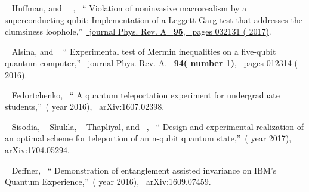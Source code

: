 \documentclass[aps,pra,twocolumn,groupedaddress,showpacs,showkeys]{revtex4-1}
\begin{document}
\begin{thebibliography}{27}
  \BibitemOpen
   { {~\bibnamefont
  {Huffman}}, and\  {~},\ }  {\enquote { {Violation of noninvasive macrorealism by a superconducting qubit: Implementation of a Leggett-Garg test that addresses the clumsiness loophole},}\ }\href {\doibase 10.1103/PhysRevA.95.032131} { {\bibinfo
  {journal} {Phys. Rev. A}\ }\textbf { {95}},\ \bibinfo
  {pages} {032131} ( {2017})}.%

  \BibitemOpen
   { {~\bibnamefont
  {Alsina}}, and  \ }  {\enquote { {Experimental test of Mermin inequalities on a five-qubit quantum computer},}\ }\href {\doibase 10.1103/PhysRevA.94.012314} { {\bibinfo
  {journal} {Phys. Rev. A}.\ }\textbf { {94}(\bibinfo
  {number} {1})},\ \bibinfo
  {pages} {012314} ( {2016})}.%

  \BibitemOpen
   { {~\bibnamefont
  {Fedortchenko}},\ }  {\enquote { {A quantum teleportation experiment for undergraduate students},}\ }(\bibinfo
  {year} {2016}),\ 
  {arXiv:1607.02398}.%

  \BibitemOpen
   { {~\bibnamefont
  {Sisodia}},  {~\bibnamefont
  {Shukla}},  {~\bibnamefont
  {Thapliyal}}, and\  {},\ }  {\enquote { {Design and experimental realization of an optimal scheme for teleportion of an n-qubit quantum state},}\ }(\bibinfo
  {year} {2017}),\ 
  {arXiv:1704.05294}.%
     
  \BibitemOpen
   { {~\bibnamefont
  {Deffner}},\ }  {\enquote { {Demonstration of entanglement assisted invariance on IBM's Quantum Experience},}\ }(\bibinfo
  {year} {2016}),\ 
  {arXiv:1609.07459}.%
  

\end{thebibliography}
\end{document}
